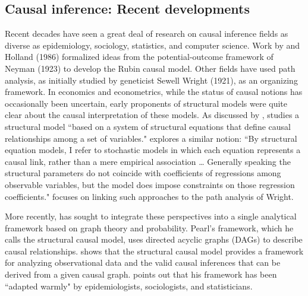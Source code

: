 \documentclass[11pt,reqno]{amsart}
\begin{document}
\begin{doublespace}
\subsection{Causal inference: Recent developments}
Recent decades have seen a great deal of research on causal inference fields as diverse as epidemiology, sociology, statistics, and computer science. 
Work by \citet{Rubin:1974im,Rubin:1977dv} and Holland (1986) formalized ideas from the potential-outcome framework of Neyman (1923) to develop the Rubin causal model. %
Other fields have used path analysis, as initially studied by geneticist Sewell Wright (1921), as an organizing framework.
In economics and econometrics, while the status of causal notions has occasionally been uncertain, early proponents of structural models were quite clear about the causal interpretation of these models.
As discussed by \citet{Heckman:2015ez}, \citet{Haavelmo:1943cl,Haavelmo:1944jq} studies a structural model ``based on a system of structural equations that define causal relationships among a set of variables."
\citet[p.\,979]{Goldberger:1972cq} explores a similar notion: ``By structural equation models, I refer to stochastic models in which each equation represents a causal link, rather than a mere empirical association \dots
Generally speaking the structural parameters do not coincide with coefficients of regressions among observable variables, but the model does impose constraints on those regression coefficients."
\citet[p.\,979]{Goldberger:1972cq} focuses on linking such approaches to the path analysis of Wright.

More recently, \citet{Pearl:2009kh} has sought to integrate these perspectives into a single analytical framework based on graph theory and probability.
Pearl's framework, which he calls the structural causal model, uses directed acyclic graphs (DAGs) to describe causal relationships.
\citet{Pearl:2009kh} shows that the structural causal model provides a framework for analyzing observational data and the valid causal inferences that can be derived from a given causal graph.
\citet[p.\,698]{Pearl:2011jd} points out that his framework has been ``adapted warmly" by epidemiologists, sociologists, and statisticians.


\end{doublespace}
\end{document}
